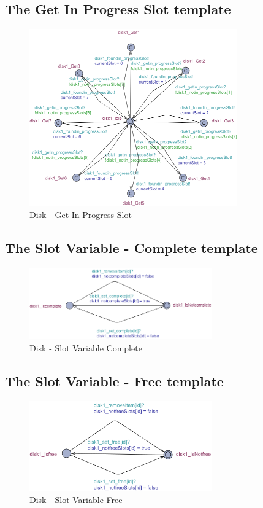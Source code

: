 \subsection{The Get In Progress Slot template}
\begin{figure}[H]
    \centering
    \includegraphics[width=0.8\textwidth]{Image/uppaal-templates/disk1_Getin_progressSlot.png}
    \caption{Disk - Get In Progress Slot}
    \label{fig:in_progress_slot}
\end{figure}

\newpage
\subsection{The Slot Variable - Complete template}
\begin{figure}[H]
    \centering
    \includegraphics[width=0.7\textwidth]{Image/uppaal-templates/disk1_SlotVariable_complete.png}
    \caption{Disk - Slot Variable Complete}
    \label{fig:slot_variable_complete}
\end{figure}

\subsection{The Slot Variable - Free template}
\begin{figure}[H]
    \centering
    \includegraphics[width=0.7\textwidth]{Image/uppaal-templates/disk1_SlotVariable_free.png}
    \caption{Disk - Slot Variable Free}
    \label{fig:slot_variable_free}
\end{figure}

